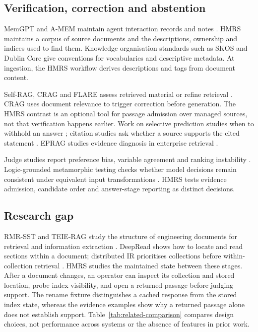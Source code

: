\subsection{Verification, correction and abstention}

MemGPT and A-MEM maintain agent interaction records and notes
\citep{memgpt,amem}. HMRS maintains a corpus of source
documents and the descriptions, ownership and indices used to find them.
Knowledge organisation standards such as SKOS \citep{skos} and Dublin Core
\citep{dcmi-terms}
give conventions for vocabularies and descriptive metadata. At ingestion,
the HMRS workflow derives descriptions and tags from document content.

Self-RAG, CRAG and FLARE assess retrieved material or refine retrieval
\citep{selfrag,crag,flare}. CRAG uses document relevance to trigger correction
before generation. The HMRS contrast is an optional tool for passage
admission over managed sources, not that verification happens earlier.
Work on selective prediction studies when to withhold an answer
\citep{kamath,feng-abstain,yin-knowwhat}; citation studies ask whether a
source supports the cited statement \citep{liu-verifiability,gao-citations}.
EPRAG studies evidence diagnosis in enterprise retrieval
\citep{kinalioglu-kbs-eprag-2026}.

Judge studies report preference bias, variable agreement and ranking
instability \citep{zheng-llmjudge,sun-urara,panickssery-selfpref}.
Logic-grounded metamorphic testing checks whether model decisions remain
consistent under equivalent input transformations \citep{zhou2026lgmt}.
HMRS tests evidence admission, candidate order and answer-stage reporting
as distinct decisions.

\subsection{Research gap}
\label{sec:gap}

RMR-SST and TEIE-RAG study the structure of engineering documents for
retrieval and information extraction
\citep{li-kbs-rmrsst-2026,shen-kbs-teierag-2026}. DeepRead shows how to locate
and read sections within a document; distributed IR prioritises collections
before within-collection retrieval \citep{deepread,callan1995searching,si2003redde}.
HMRS studies the maintained state between these stages. After a document
changes, an operator can inspect its collection and stored location, probe
index visibility, and open a returned passage before judging support. The
rename fixture distinguishes a cached response from the stored index state, whereas the
evidence examples show why a returned passage alone does not establish
support. Table~\ref{tab:related-comparison} compares design choices, not
performance across systems or the absence of features in prior work.
